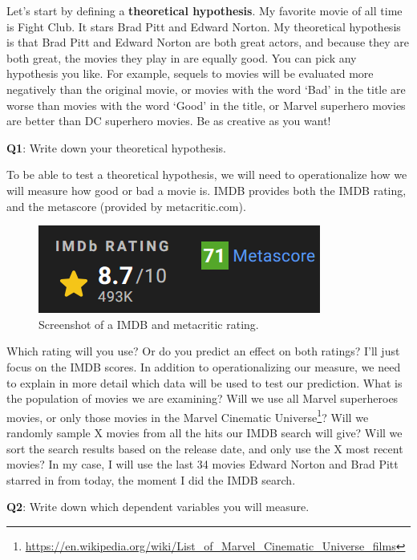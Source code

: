 \documentclass[
  oneside]{krantz}
\renewcommand{\href}[2]{#2\footnote{\url{#1}}}
\begin{document}
Let's start by defining a \textbf{theoretical hypothesis}. My favorite movie of all time is Fight Club. It stars Brad Pitt and Edward Norton. My theoretical hypothesis is that Brad Pitt and Edward Norton are both great actors, and because they are both great, the movies they play in are equally good. You can pick any hypothesis you like. For example, sequels to movies will be evaluated more negatively than the original movie, or movies with the word `Bad' in the title are worse than movies with the word `Good' in the title, or Marvel superhero movies are better than DC superhero movies. Be as creative as you want!

\textbf{Q1}: Write down your theoretical hypothesis.

To be able to test a theoretical hypothesis, we will need to operationalize how we will measure how good or bad a movie is. IMDB provides both the IMDB rating, and the metascore (provided by metacritic.com).



\begin{figure}

{\centering \includegraphics[width=0.4\linewidth]{images/imdbrating} 

}

\caption{Screenshot of a IMDB and metacritic rating.}\label{fig:imdbrating}
\end{figure}

Which rating will you use? Or do you predict an effect on both ratings? I'll just focus on the IMDB scores. In addition to operationalizing our measure, we need to explain in more detail which data will be used to test our prediction. What is the population of movies we are examining? Will we use all Marvel superheroes movies, or only those movies in the \href{https://en.wikipedia.org/wiki/List_of_Marvel_Cinematic_Universe_films}{Marvel Cinematic Universe}? Will we randomly sample X movies from all the hits our IMDB search will give? Will we sort the search results based on the release date, and only use the X most recent movies? In my case, I will use the last 34 movies Edward Norton and Brad Pitt starred in from today, the moment I did the IMDB search.

\textbf{Q2}: Write down which dependent variables you will measure.
\end{document}
